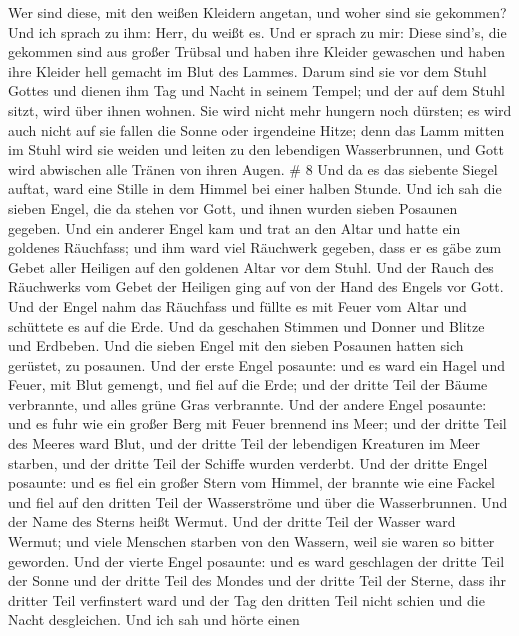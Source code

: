 Wer sind diese, mit den weißen Kleidern angetan, und woher sind sie
gekommen?  Und ich sprach zu ihm: Herr, du weißt es. Und er
sprach zu mir: Diese sind's, die gekommen sind aus großer Trübsal und
haben ihre Kleider gewaschen und haben ihre Kleider hell gemacht im Blut
des Lammes.  Darum sind sie vor dem Stuhl Gottes und dienen
ihm Tag und Nacht in seinem Tempel; und der auf dem Stuhl sitzt, wird
über ihnen wohnen.  Sie wird nicht mehr hungern noch
dürsten; es wird auch nicht auf sie fallen die Sonne oder irgendeine
Hitze;  denn das Lamm mitten im Stuhl wird sie weiden und
leiten zu den lebendigen Wasserbrunnen, und Gott wird abwischen alle
Tränen von ihren Augen. \# 8  Und da es das siebente Siegel
auftat, ward eine Stille in dem Himmel bei einer halben Stunde.
 Und ich sah die sieben Engel, die da stehen vor Gott, und
ihnen wurden sieben Posaunen gegeben.  Und ein anderer Engel
kam und trat an den Altar und hatte ein goldenes Räuchfass; und ihm ward
viel Räuchwerk gegeben, dass er es gäbe zum Gebet aller Heiligen auf den
goldenen Altar vor dem Stuhl.  Und der Rauch des Räuchwerks
vom Gebet der Heiligen ging auf von der Hand des Engels vor Gott.
 Und der Engel nahm das Räuchfass und füllte es mit Feuer
vom Altar und schüttete es auf die Erde. Und da geschahen Stimmen und
Donner und Blitze und Erdbeben.  Und die sieben Engel mit
den sieben Posaunen hatten sich gerüstet, zu posaunen.  Und
der erste Engel posaunte: und es ward ein Hagel und Feuer, mit Blut
gemengt, und fiel auf die Erde; und der dritte Teil der Bäume
verbrannte, und alles grüne Gras verbrannte.  Und der andere
Engel posaunte: und es fuhr wie ein großer Berg mit Feuer brennend ins
Meer; und der dritte Teil des Meeres ward Blut,  und der
dritte Teil der lebendigen Kreaturen im Meer starben, und der dritte
Teil der Schiffe wurden verderbt.  Und der dritte Engel
posaunte: und es fiel ein großer Stern vom Himmel, der brannte wie eine
Fackel und fiel auf den dritten Teil der Wasserströme und über die
Wasserbrunnen.  Und der Name des Sterns heißt Wermut. Und
der dritte Teil der Wasser ward Wermut; und viele Menschen starben von
den Wassern, weil sie waren so bitter geworden.  Und der
vierte Engel posaunte: und es ward geschlagen der dritte Teil der Sonne
und der dritte Teil des Mondes und der dritte Teil der Sterne, dass ihr
dritter Teil verfinstert ward und der Tag den dritten Teil nicht schien
und die Nacht desgleichen.  Und ich sah und hörte einen
